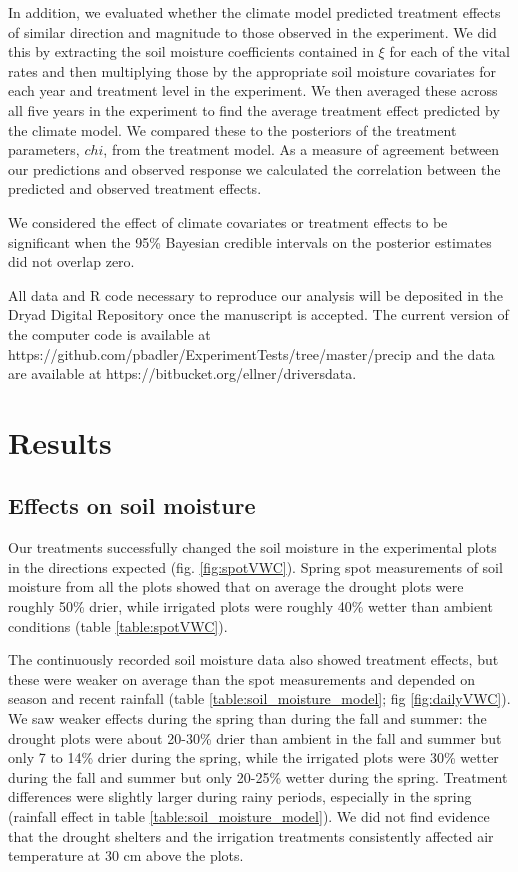 \documentclass[11pt]{article}
\begin{document}
\begin{doublespace}
In addition, we evaluated whether the climate model predicted treatment effects of similar direction and magnitude to those observed in the experiment.  We did this by extracting the soil moisture coefficients contained in $\xi$ for each of the vital rates and then multiplying those by the appropriate soil moisture covariates for each year and treatment level in the experiment.  We then averaged these across all five years in the experiment to find the average treatment effect predicted by the climate model.  We compared these to the posteriors of the treatment parameters, $chi$, from the treatment model.  As a measure of agreement between our predictions and observed response we calculated the correlation between the predicted and observed treatment effects. 

We considered the effect of climate covariates or treatment effects to be significant when the 95\% Bayesian credible intervals on the posterior estimates did not overlap zero.  

All data and R code necessary to reproduce our analysis will be deposited in the Dryad Digital Repository once the manuscript is accepted. The current version of the computer code is available at https://github.com/pbadler/ExperimentTests/tree/master/precip and the data are available at https://bitbucket.org/ellner/driversdata. 

\section*{Results}

\subsection*{Effects on soil moisture}

Our treatments successfully changed the soil moisture in the experimental plots in the directions expected (fig. \ref{fig:spotVWC}). Spring spot measurements of soil moisture from all the plots showed that on average the drought plots were roughly 50\% drier, while irrigated plots were roughly 40\% wetter than ambient conditions (table \ref{table:spotVWC}).
  
The continuously recorded soil moisture data also showed treatment effects, but these were weaker on average than the spot measurements and depended on season and recent rainfall (table \ref{table:soil_moisture_model}; fig \ref{fig:dailyVWC}). We saw weaker effects during the spring than during the fall and summer: the drought plots were about 20-30\% drier than ambient in the fall and summer but only 7 to 14\% drier during the spring, while the irrigated plots were 30\% wetter during the fall and summer but only 20-25\% wetter during the spring.  Treatment differences were slightly larger during rainy periods, especially in the spring (rainfall effect in table \ref{table:soil_moisture_model}). We did not find evidence that the drought shelters and the irrigation treatments consistently affected air temperature at 30 cm above the plots.  


\end{doublespace}
\end{document}
